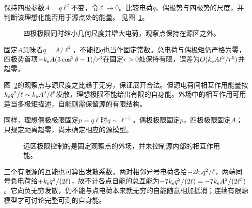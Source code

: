 \begin{exercise}[四极矩的尺度]\label{ex:es1-h13}
保持四极参数$A=q\ell^2$不变，令$\ell\to0$。比较电荷$q$、偶极势与四极势的尺度，并判断该理想化能否用于源点处的能量。 见图~\ref{fig:es1-h13-q}。
\end{exercise}

\begin{figure}[H]\centering
{}
\caption{四极极限同时缩小几何尺度并增大电荷，观察点保持在源区之外。}\label{fig:es1-h13-q}
\end{figure}
\begin{solution}
固定$A$意味着$q=A/\ell^2$，不能把$q$也当作固定常数。总电荷与偶极矩仍严格为零，四极势首项$-k_{\rm e} A(3\cos^2\theta-1)/r^3$在固定$r>0$处保持有限，误差为$O(k_{\rm e} A\ell^2/r^5)$并趋零。

图~\ref{fig:es1-h13-s}的观察点与源尺度之比趋于无穷，保证展开合法。但源电荷间相互作用能量按$k_{\rm e} q^2/\ell\sim k_{\rm e} A^2/\ell^5$发散，理想极限不能给出有限的自身能。外场中的相互作用可用适当多极矩描述，自能则需保留源的有限结构。

同样，理想偶极极限固定$p=q\ell$时$q\sim\ell^{-1}$。偶极极限固定$p$，四极极限固定$A$；只规定距离趋零，尚未确定相应的源模型。
\begin{figure}[H]\centering
{}
\caption{远区极限控制的是固定观察点的外场，并未控制源内部的相互作用能。}\label{fig:es1-h13-s}
\end{figure}


三个有限源的互能也可算出发散系数。两对相邻异号电荷各给$-2k_{\rm e} q^2/\ell$，两端同号负电荷给$+k_{\rm e} q^2/(2\ell)$，故不计各点自能的总互能为$-7k_{\rm e} q^2/(2\ell)=-7k_{\rm e} A^2/(2\ell^5)$。它向负无穷发散，仍不能与点电荷本来就无穷的自能随意相加抵消；连续有限源模型才可讨论完整可测的自身能。
\end{solution}

